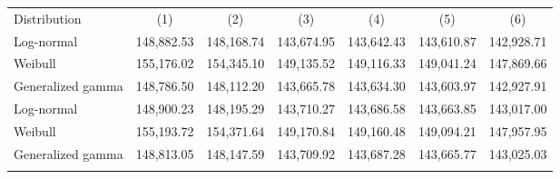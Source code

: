\begin{center}
\begin{tabular}{lcccccc}
\hline \noalign{\smallskip}Distribution & (1) & (2) & (3) & (4) & (5) & (6)\\
\noalign{\smallskip}\hline \noalign{\smallskip}Log-normal & 148,882.53 & 148,168.74 & 143,674.95 & 143,642.43 & 143,610.87 & 142,928.71\\
Weibull & 155,176.02 & 154,345.10 & 149,135.52 & 149,116.33 & 149,041.24 & 147,869.66\\
Generalized gamma & 148,786.50 & 148,112.20 & 143,665.78 & 143,634.30 & 143,603.97 & 142,927.91\\
Log-normal & 148,900.23 & 148,195.29 & 143,710.27 & 143,686.58 & 143,663.85 & 143,017.00\\
Weibull & 155,193.72 & 154,371.64 & 149,170.84 & 149,160.48 & 149,094.21 & 147,957.95\\
Generalized gamma & 148,813.05 & 148,147.59 & 143,709.92 & 143,687.28 & 143,665.77 & 143,025.03\\
\noalign{\smallskip}\hline\end{tabular}\\
\end{center}
